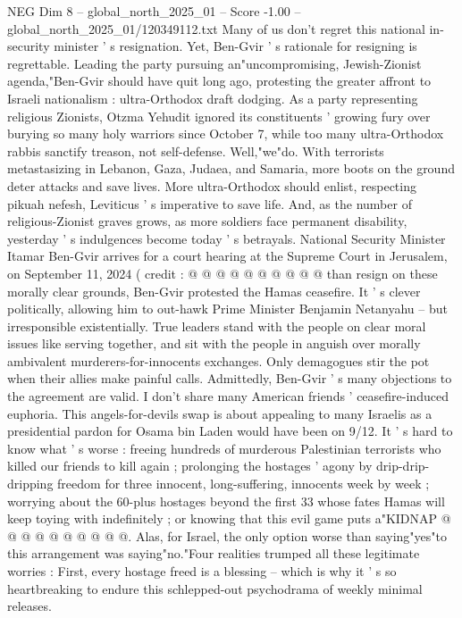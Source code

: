 \begin{textsample}{NEG Dim 8 – global\_north\_2025\_01 – Score -1.00 – global\_north\_2025\_01/120349112.txt}  \label{ex:f8_neg_347}
Many of us don't regret this national in-security minister ' s resignation.
Yet, Ben-Gvir ' s rationale for resigning is regrettable.
Leading the party pursuing an"uncompromising, Jewish-Zionist agenda,"Ben-Gvir should have quit long ago, protesting the greater affront to Israeli nationalism : ultra-Orthodox draft dodging.
As a party representing religious Zionists, Otzma Yehudit ignored its constituents ' growing fury over burying so many holy warriors since October 7, while too many ultra-Orthodox rabbis sanctify treason, not self-defense.
Well,"we"do.
With terrorists metastasizing in Lebanon, Gaza, Judaea, and Samaria, more boots on the ground deter attacks and save lives.
More ultra-Orthodox should enlist, respecting pikuah nefesh, Leviticus ' s imperative to save life.
And, as the number of religious-Zionist graves grows, as more soldiers face permanent disability, yesterday ' s indulgences become today ' s betrayals.
National Security Minister Itamar Ben-Gvir arrives for a court hearing at the Supreme Court in Jerusalem, on September 11, 2024 ( credit : @ @ @ @ @ @ @ @ @ @ than resign on these morally clear grounds, Ben-Gvir protested the Hamas ceasefire.
It ' s clever politically, allowing him to out-hawk Prime Minister Benjamin Netanyahu -- but irresponsible existentially.
True leaders stand with the people on clear moral issues like serving together, and sit with the people in anguish over morally ambivalent murderers-for-innocents exchanges.
Only demagogues stir the pot when their allies make painful calls.
Admittedly, Ben-Gvir ' s many objections to the agreement are valid.
I don't share many American friends ' ceasefire-induced euphoria.
This angels-for-devils swap is about appealing to many Israelis as a presidential pardon for Osama bin Laden would have been on 9/12.
It ' s hard to know what ' s worse : freeing hundreds of murderous Palestinian terrorists who killed our friends to kill again ; prolonging the hostages ' agony by drip-drip-dripping freedom for three innocent, long-suffering, innocents week by week ; worrying about the 60-plus hostages beyond the first 33 whose fates Hamas will keep toying with indefinitely ; or knowing that this evil game puts a"KIDNAP @ @ @ @ @ @ @ @ @ @.
Alas, for Israel, the only option worse than saying"yes"to this arrangement was saying"no."Four realities trumped all these legitimate worries : First, every hostage freed is a blessing -- which is why it ' s so heartbreaking to endure this schlepped-out psychodrama of weekly minimal releases.

\end{textsample}
